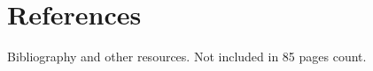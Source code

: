 \graphicspath{{chapters/08_references/}}
\chapter*{References}




Bibliography and other resources. Not included in 85 pages count.
